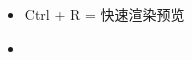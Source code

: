 \documentclass[UTF8]{ctexart}
\begin{document}
\begin{itemize}
    \item Ctrl + R = 快速渲染预览
    \item 
\end{itemize}
\end{document}
